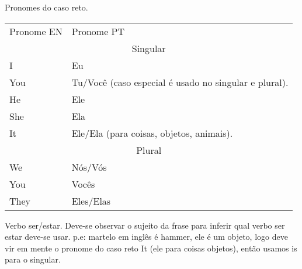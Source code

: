 Pronomes do caso reto.
\begin{center}
  \begin{tabular}{ |p{2cm}|p{2cm}| }
    \hline
    Pronome EN&          Pronome PT \\
    \cline{1-2}
    \multicolumn{2}{|c|}{Singular} \\
    \cline{1-2}
    I&                   Eu \\ \hline
    You&                 Tu/Você (caso especial é usado no singular e plural). \\ \hline
    He&                  Ele \\ \hline
    She&                 Ela \\ \hline
    It&                  Ele/Ela (para coisas, objetos, animais). \\
    \cline{1-2}
    \multicolumn{2}{|c|}{Plural} \\
    \cline{1-2}
    We&                  Nós/Vós \\ \hline
    You&                 Vocês \\ \hline
    They&                Eles/Elas \\ \hline
  \end{tabular}
\end{center}

Verbo ser/estar. Deve-se observar o sujeito da frase para inferir qual
verbo ser estar deve-se usar. p.e: martelo em inglês é hammer, ele é
um objeto, logo deve vir em mente o pronome do caso reto It (ele para
coisas objetos), então usamos is para o singular.